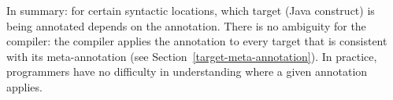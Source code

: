 \documentclass[10pt]{article}
\begin{document}
In summary:  for certain syntactic locations, which target (Java construct)
is being annotated depends on the annotation.
There is no ambiguity for the compiler:
the compiler applies the annotation to every
target that is consistent with its meta-annotation (see
Section~\ref{target-meta-annotation}).
In practice, programmers
have no difficulty in understanding where a given annotation applies.















\end{document}
